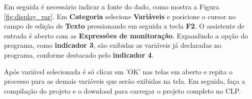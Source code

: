 Em seguida é necessário indicar a fonte do dado, 
como mostra a Figura \ref{fig:display_var}. 
Em \textbf{Categoria} selecione \textbf{Variáveis} e 
posicione o cursor no campo de edição de \textbf{Texto} 
pressionando em seguida a tecla \textbf{F2}. 
O assistente de entrada é aberto com as \textbf{Expressões de monitoração}. 
Expandindo a opção do programa, como \textbf{indicador 3}, 
são exibidas as variáveis já declaradas no programa, 
conforme destacado pelo \textbf{indicador 4}. 



\begin{figure}[ht!]
	\centering
\end{figure}

Após variável selecionada é só clicar em 'OK' nas telas em aberto e repita o processo para as demais variáveis que serão exibidas na tela. 
Em seguida, faça a compilação do projeto e o download para carregar o projeto completo no CLP. 


